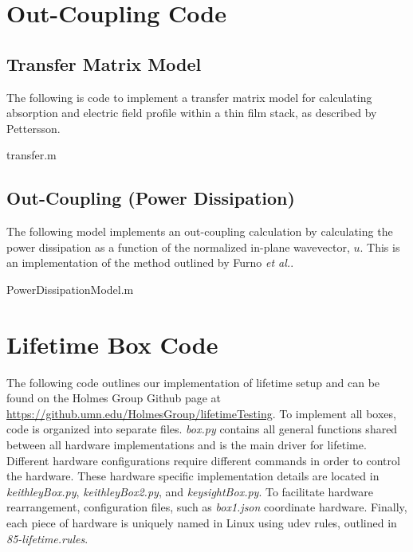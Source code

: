 \documentclass[../thesis.tex]{subfiles}
\begin{document}
\chapter{Out-Coupling Code}\label{sec:outCoupling_code}
\section{Transfer Matrix Model}
The following is code to implement a transfer matrix model for calculating absorption and electric field profile within a thin film stack, as described by Pettersson.\supercite{Pettersson1999}

transfer.m


\section{Out-Coupling (Power Dissipation)}
The following model implements an out-coupling calculation by calculating the power dissipation as a function of the normalized in-plane wavevector, $u$.  
This is an implementation of the method outlined by Furno \textit{et al.}.\supercite{Furno2010,Furno2012}

PowerDissipationModel.m


\chapter{Lifetime Box Code}\label{sec:lifetime_code}

The following code outlines our implementation of lifetime setup and can be found on the Holmes Group Github page at \url{https://github.umn.edu/HolmesGroup/lifetimeTesting}.
To implement all boxes, code is organized into separate files.
\textit{box.py} contains all general functions shared between all hardware implementations and is the main driver for lifetime.
Different hardware configurations require different commands in order to control the hardware.
These hardware specific implementation details are located in \textit{keithleyBox.py}, \textit{keithleyBox2.py}, and \textit{keysightBox.py}.
To facilitate hardware rearrangement, configuration files, such as \textit{box1.json} coordinate hardware.
Finally, each piece of hardware is uniquely named in Linux using udev rules, outlined in \textit{85-lifetime.rules}.

%
\end{document}
